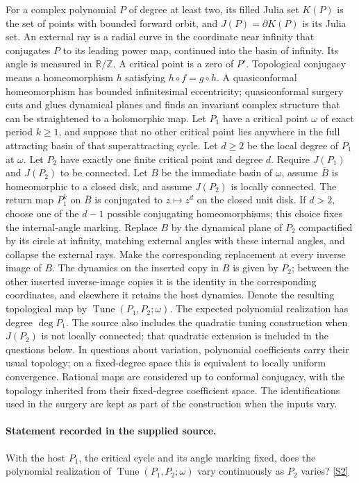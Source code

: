\documentclass[11pt]{article}
\newcommand{\sref}[2]{\hyperlink{source:#1:#2}{[S#2]}}
\begin{document}
For a complex polynomial $P$ of degree at least two, its filled Julia set $K(P)$ is the set of points with bounded forward orbit, and $J(P)=\partial K(P)$ is its Julia set. An external ray is a radial curve in the coordinate near infinity that conjugates $P$ to its leading power map, continued into the basin of infinity. Its angle is measured in $\mathbb R/\mathbb Z$. A critical point is a zero of $P'$. Topological conjugacy means a homeomorphism $h$ satisfying $h\circ f=g\circ h$. A quasiconformal homeomorphism has bounded infinitesimal eccentricity; quasiconformal surgery cuts and glues dynamical planes and finds an invariant complex structure that can be straightened to a holomorphic map.
Let $P_1$ have a critical point $\omega$ of exact period $k\geq1$, and suppose that no other critical point lies anywhere in the full attracting basin of that superattracting cycle. Let $d\geq2$ be the local degree of $P_1$ at $\omega$. Let $P_2$ have exactly one finite critical point and degree $d$. Require $J(P_1)$ and $J(P_2)$ to be connected. Let $B$ be the immediate basin of $\omega$, assume $\overline B$ is homeomorphic to a closed disk, and assume $J(P_2)$ is locally connected. The return map $P_1^k$ on $\overline B$ is conjugated to $z\mapsto z^d$ on the closed unit disk. If $d>2$, choose one of the $d-1$ possible conjugating homeomorphisms; this choice fixes the internal-angle marking.
Replace $B$ by the dynamical plane of $P_2$ compactified by its circle at infinity, matching external angles with these internal angles, and collapse the external rays. Make the corresponding replacement at every inverse image of $B$. The dynamics on the inserted copy in $B$ is given by $P_2$; between the other inserted inverse-image copies it is the identity in the corresponding coordinates, and elsewhere it retains the host dynamics. Denote the resulting topological map by $\operatorname{Tune}(P_1,P_2;\omega)$. The expected polynomial realization has degree $\deg P_1$. The source also includes the quadratic tuning construction when $J(P_2)$ is not locally connected; that quadratic extension is included in the questions below.
In questions about variation, polynomial coefficients carry their usual topology; on a fixed-degree space this is equivalent to locally uniform convergence. Rational maps are considered up to conformal conjugacy, with the topology inherited from their fixed-degree coefficient space. The identifications used in the surgery are kept as part of the construction when the inputs vary.
\paragraph{Statement recorded in the supplied source.}
With the host $P_1$, the critical cycle and its angle marking fixed, does the polynomial realization of $\operatorname{Tune}(P_1,P_2;\omega)$ vary continuously as $P_2$ varies? \sref{5300006}{2}
\end{document}
